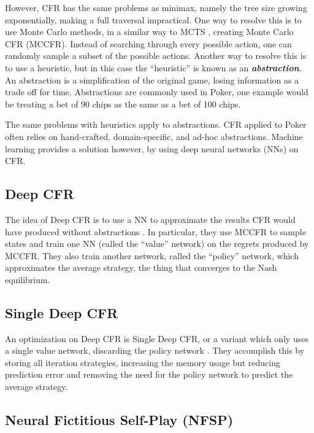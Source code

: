 \documentclass[11pt, oneside]{article}
\newcommand{\emphasis}[1]{\textbf{\textit{#1}}}
\begin{document}
However, CFR has the same problems as minimax, namely the tree size growing
exponentially, making a full traversal impractical. One way to resolve this
is to use Monte Carlo methods, in a similar way to MCTS \cite{DBLP:conf/nips/GibsonBLS12}, creating Monte Carlo CFR (MCCFR).
Instead of searching through every possible action, one can randomly sample a
subset of the possible actions.
Another way to resolve this
is to use a heuristic, but in this case the ``heuristic'' is known as an
\emphasis{abstraction}. An abstraction is a simplification of the original
game, losing information as a trade off for time.
Abstractions are commonly used in Poker, one example would be treating
a bet of 90 chips as the same as a bet of 100 chips.

The same problems with heuristics apply to abstractions. CFR applied to Poker
often relies on hand-crafted, domain-specific, and ad-hoc abstractions.
Machine learning provides a solution however, by using deep neural networks (NNs)
on CFR.

\subsection{Deep CFR}

The idea of Deep CFR is to use a NN to approximate the results CFR would have
produced without abstractions \cite{DBLP:journals/corr/abs-1811-00164}.
In particular, they use MCCFR to sample states and train one NN (called the ``value'' network) on the regrets produced by MCCFR.
They also train another network, called the ``policy'' network,
which approximates the average strategy, the thing that converges
to the Nash equilibrium.

\subsection{Single Deep CFR}

An optimization on Deep CFR is Single Deep CFR, or a variant which
only uses a single value network, discarding the policy network \cite{DBLP:journals/corr/abs-1901-07621}. They accomplish this by storing all iteration strategies,
increasing the memory usage but reducing prediction error and removing the need
for the policy network to predict the average strategy.

\subsection{Neural Fictitious Self-Play (NFSP)}
\end{document}
